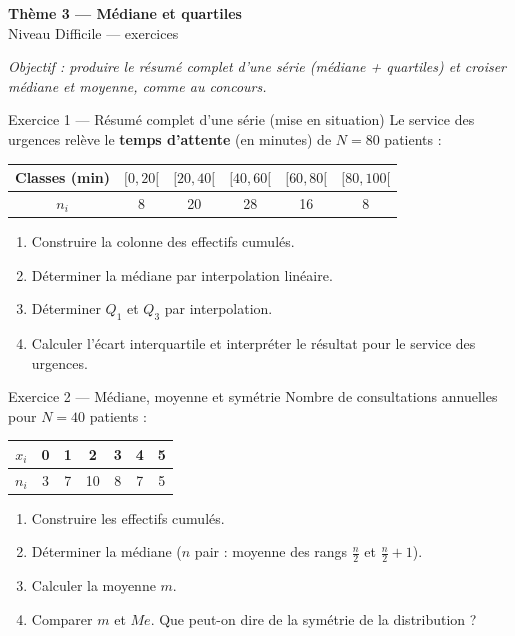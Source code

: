 \documentclass[11pt,a4paper]{article}
\newcommand{\bandeau}[2]{%
\begin{tcolorbox}[boxbase,colback=primary,colframe=primarydark,halign=center,
   before skip=2pt,after skip=12pt]
{\LARGE\bfseries\color{white} #1}\\[3pt]{\normalsize\color{white} #2}
\end{tcolorbox}}
\newcommand{\med}{M\!e}
\begin{document}
\bandeau{Thème 3 — Médiane et quartiles}{Niveau Difficile — exercices}

\noindent\textit{Objectif : produire le résumé complet d'une série (médiane + quartiles) et croiser
médiane et moyenne, comme au concours.}\medskip

\begin{exobox}{Exercice 1 — Résumé complet d'une série (mise en situation)}
Le service des urgences relève le \textbf{temps d'attente} (en minutes) de $N=80$ patients :
\begin{center}
\renewcommand{\arraystretch}{1.2}
\begin{tabular}{|c|c|c|c|c|c|}
\hline
Classes (min) & $[0,20[$ & $[20,40[$ & $[40,60[$ & $[60,80[$ & $[80,100[$ \\\hline
$n_i$ & 8 & 20 & 28 & 16 & 8 \\\hline
\end{tabular}
\end{center}
\begin{enumerate}[label=\textbf{(\alph*)}]
  \item Construire la colonne des effectifs cumulés.
  \item Déterminer la médiane par interpolation linéaire.
  \item Déterminer $Q_1$ et $Q_3$ par interpolation.
  \item Calculer l'écart interquartile et interpréter le résultat pour le service des urgences.
\end{enumerate}
\end{exobox}

\begin{exobox}{Exercice 2 — Médiane, moyenne et symétrie}
Nombre de consultations annuelles pour $N=40$ patients :
\begin{center}
\renewcommand{\arraystretch}{1.15}
\begin{tabular}{|c|c|c|c|c|c|c|}
\hline
$x_i$ & 0 & 1 & 2 & 3 & 4 & 5 \\\hline
$n_i$ & 3 & 7 & 10 & 8 & 7 & 5 \\\hline
\end{tabular}
\end{center}
\begin{enumerate}[label=\textbf{(\alph*)}]
  \item Construire les effectifs cumulés.
  \item Déterminer la médiane ($n$ pair : moyenne des rangs $\tfrac{n}{2}$ et $\tfrac{n}{2}+1$).
  \item Calculer la moyenne $m$.
  \item Comparer $m$ et $\med$. Que peut-on dire de la symétrie de la distribution ?
\end{enumerate}
\end{exobox}
\end{document}
